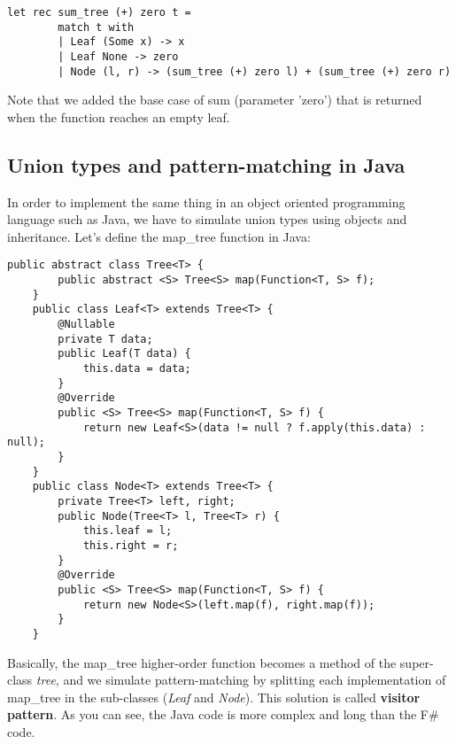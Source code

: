\begin{lstlisting}[style = FSharpStyle]
    let rec sum_tree (+) zero t =
        match t with
        | Leaf (Some x) -> x
        | Leaf None -> zero
        | Node (l, r) -> (sum_tree (+) zero l) + (sum_tree (+) zero r)
\end{lstlisting}
Note that we added the base case of sum (parameter 'zero') that is returned when the function reaches an empty leaf.
\subsection{Union types and pattern-matching in Java}
In order to implement the same thing in an object oriented programming language such as Java, we have to simulate union types using objects and inheritance.\newline\newline
Let's define the map\_tree function in Java:
\begin{lstlisting}[style = JavaStyle]
    public abstract class Tree<T> {
        public abstract <S> Tree<S> map(Function<T, S> f);
    }
    public class Leaf<T> extends Tree<T> {
        @Nullable
        private T data;
        public Leaf(T data) {
            this.data = data;
        }
        @Override
        public <S> Tree<S> map(Function<T, S> f) {
            return new Leaf<S>(data != null ? f.apply(this.data) : null);
        }
    }
    public class Node<T> extends Tree<T> {
        private Tree<T> left, right;
        public Node(Tree<T> l, Tree<T> r) {
            this.leaf = l;
            this.right = r;
        }
        @Override
        public <S> Tree<S> map(Function<T, S> f) {
            return new Node<S>(left.map(f), right.map(f));
        }
    }
\end{lstlisting}
Basically, the map\_tree higher-order function becomes a method of the super-class \textit{tree}, and we simulate pattern-matching by splitting each implementation of map\_tree in the sub-classes (\textit{Leaf} and \textit{Node}). This solution is called \textbf{visitor pattern}. As you can see, the Java code is more complex and long than the F\# code.
